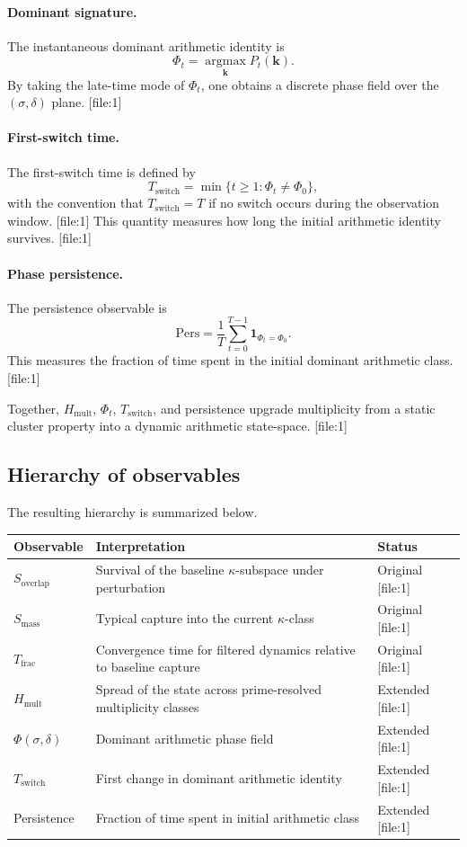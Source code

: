 \documentclass[11pt]{article}
\begin{document}
\paragraph{Dominant signature.}
The instantaneous dominant arithmetic identity is
\[
\Phi_t = \operatorname*{argmax}_{\mathbf{k}} P_t(\mathbf{k}).
\]
By taking the late-time mode of $\Phi_t$, one obtains a discrete phase field over the $(\sigma,\delta)$ plane. [file:1]

\paragraph{First-switch time.}
The first-switch time is defined by
\[
T_{\mathrm{switch}} = \min\{t\ge 1 : \Phi_t \neq \Phi_0\},
\]
with the convention that $T_{\mathrm{switch}}=T$ if no switch occurs during the observation window. [file:1] This quantity measures how long the initial arithmetic identity survives. [file:1]

\paragraph{Phase persistence.}
The persistence observable is
\[
\mathrm{Pers} = \frac{1}{T}\sum_{t=0}^{T-1} \mathbf 1_{\Phi_t = \Phi_0}.
\]
This measures the fraction of time spent in the initial dominant arithmetic class. [file:1]

Together, $H_{\mathrm{mult}}$, $\Phi_t$, $T_{\mathrm{switch}}$, and persistence upgrade multiplicity from a static cluster property into a dynamic arithmetic state-space. [file:1]

\subsection{Hierarchy of observables}

The resulting hierarchy is summarized below.

\begin{center}
\begin{tabular}{@{}p{3.3cm}p{8cm}p{2.6cm}@{}}
\toprule
Observable & Interpretation & Status \\
\midrule
$S_{\mathrm{overlap}}$ & Survival of the baseline $\kappa$-subspace under perturbation & Original [file:1] \\
$S_{\mathrm{mass}}$ & Typical capture into the current $\kappa$-class & Original [file:1] \\
$T_{\mathrm{frac}}$ & Convergence time for filtered dynamics relative to baseline capture & Original [file:1] \\
$H_{\mathrm{mult}}$ & Spread of the state across prime-resolved multiplicity classes & Extended [file:1] \\
$\Phi(\sigma,\delta)$ & Dominant arithmetic phase field & Extended [file:1] \\
$T_{\mathrm{switch}}$ & First change in dominant arithmetic identity & Extended [file:1] \\
Persistence & Fraction of time spent in initial arithmetic class & Extended [file:1] \\
\bottomrule
\end{tabular}
\end{center}
\end{document}

